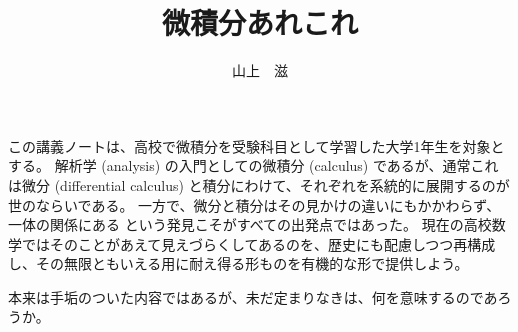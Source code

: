 \documentclass[a4paper]{jsarticle}
\title{微積分あれこれ}
\author{山上　滋}
\theoremstyle{definition}
\theoremstyle{remark}
\begin{document}
\maketitle
\baselineskip=16pt
\tableofcontents


\bigskip
\bigskip








この講義ノートは、高校で微積分を受験科目として学習した大学1年生を対象とする。
解析学 (analysis) の入門としての微積分 (calculus) であるが、通常これは微分 (differential calculus) と積分にわけて、それぞれを系統的に展開するのが世のならいである。
一方で、微分と積分はその見かけの違いにもかかわらず、一体の関係にある という発見こそがすべての出発点ではあった。
現在の高校数学ではそのことがあえて見えづらくしてあるのを、歴史にも配慮しつつ再構成し、その無限ともいえる用に耐え得る形ものを有機的な形で提供しよう。

本来は手垢のついた内容ではあるが、未だ定まりなきは、何を意味するのであろうか。

\end{document}
